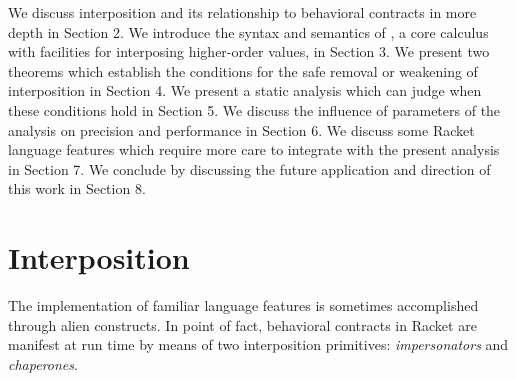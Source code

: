 \documentclass{sigplanconf}
\begin{document}






We discuss interposition and its relationship to behavioral contracts in more depth in Section 2.
We introduce the syntax and semantics of \chapcalc, a core calculus with facilities for interposing higher-order values, in Section 3.
We present two theorems which establish the conditions for the safe removal or weakening of interposition in Section 4.
We present a static analysis which can judge when these conditions hold in Section 5.
We discuss the influence of parameters of the analysis on precision and performance in Section 6.
We discuss some Racket language features which require more care to integrate with the present analysis in Section 7.
We conclude by discussing the future application and direction of this work in Section 8.

\section{Interposition}

The implementation of familiar language features is sometimes accomplished through alien constructs.
In point of fact, behavioral contracts in Racket are manifest at run time by means of two interposition primitives: \emph{impersonators} and \emph{chaperones}.
\end{document}
